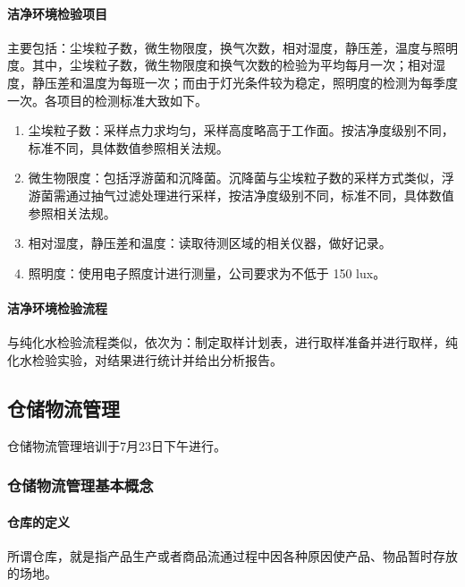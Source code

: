 \paragraph{洁净环境检验项目} 主要包括：尘埃粒子数，微生物限度，换气次数，相对湿度，静压差，温度与照明度。其中，尘埃粒子数，微生物限度和换气次数的检验为平均每月一次；相对湿度，静压差和温度为每班一次；而由于灯光条件较为稳定，照明度的检测为每季度一次。各项目的检测标准大致如下。

\begin{enumerate}
    \item 尘埃粒子数：采样点力求均匀，采样高度略高于工作面。按洁净度级别不同，标准不同，具体数值参照相关法规。
    \item 微生物限度：包括浮游菌和沉降菌。沉降菌与尘埃粒子数的采样方式类似，浮游菌需通过抽气过滤处理进行采样，按洁净度级别不同，标准不同，具体数值参照相关法规。
    \item 相对湿度，静压差和温度：读取待测区域的相关仪器，做好记录。
    \item 照明度：使用电子照度计进行测量，公司要求为不低于 150 lux。
\end{enumerate}

\paragraph{洁净环境检验流程} 与纯化水检验流程类似，依次为：制定取样计划表，进行取样准备并进行取样，纯化水检验实验，对结果进行统计并给出分析报告。

\subsection{仓储物流管理}
仓储物流管理培训于7月23日下午进行。

\subsubsection{仓储物流管理基本概念}

\paragraph{仓库的定义} 所谓仓库，就是指产品生产或者商品流通过程中因各种原因使产品、物品暂时存放的场地。

